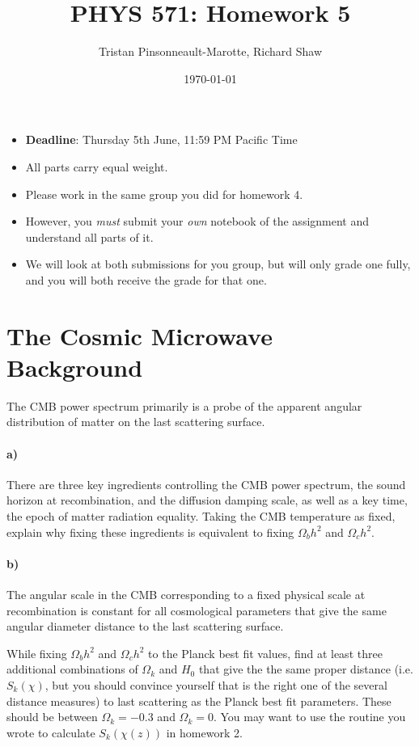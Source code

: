 \documentclass[12pt]{article}
\author{Tristan Pinsonneault-Marotte, Richard Shaw}
\title{PHYS 571: Homework 5}
\date{\today}
\begin{document}
\maketitle


\begin{itemize}
    \item \textbf{Deadline}: Thursday 5th June, 11:59 PM Pacific Time
    \item All parts carry equal weight.
    \item Please work in the same group you did for homework 4.
    \item However, you \emph{must} submit your \emph{own} notebook of the assignment and understand all parts of it.
    \item We will look at both submissions for you group, but will only grade one fully, and you will both receive the grade for that one.
\end{itemize}

\section{The Cosmic Microwave Background}

The CMB power spectrum primarily is a probe of the apparent angular distribution of matter on the last scattering surface.

\paragraph{a)} There are three key ingredients controlling the CMB power spectrum, the sound horizon at recombination, and the diffusion damping scale, as well as a key time, the epoch of matter radiation equality. Taking the CMB temperature as fixed, explain why fixing these ingredients is equivalent to fixing $\Omega_b h^2$ and $\Omega_c h^2$.

\paragraph{b)} The angular scale in the CMB corresponding to a fixed physical scale at recombination is constant for all cosmological parameters that give the same angular diameter distance to the last scattering surface.

While fixing $\Omega_b h^2$ and $\Omega_c h^2$ to the Planck best fit values, find at least three additional combinations of $\Omega_k$ and $H_0$ that give the the same proper distance (i.e. $S_k(\chi)$, but you should convince yourself that is the right one of the several distance measures) to last scattering as the Planck best fit parameters. These should be between $\Omega_k = -0.3$ and $\Omega_k = 0$. You may want to use the routine you wrote to calculate $S_k(\chi(z))$ in homework 2.
\end{document}
